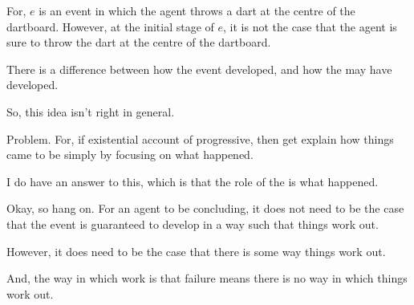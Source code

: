 \begin{note}
  For, \(e\) is an event in which the agent throws a dart at the centre of the dartboard.
  However, at the initial stage of \(e\), it is not the case that the agent is sure to throw the dart at the centre of the dartboard.

  There is a difference between how the event developed, and how the may have developed.

  So, this idea isn't right in general.

  Problem.
  For, if existential account of progressive, then get explain how things came to be simply by focusing on what happened.

  I do have an answer to this, which is that the role of the \fc{} is what happened.

  Okay, so hang on.
  For an agent to be concluding, it does not need to be the case that the event is guaranteed to develop in a way such that things work out.

  However, it does need to be the case that there is some way things work out.

  And, the way in which  work is that failure means there is no way in which things work out.
\end{note}

